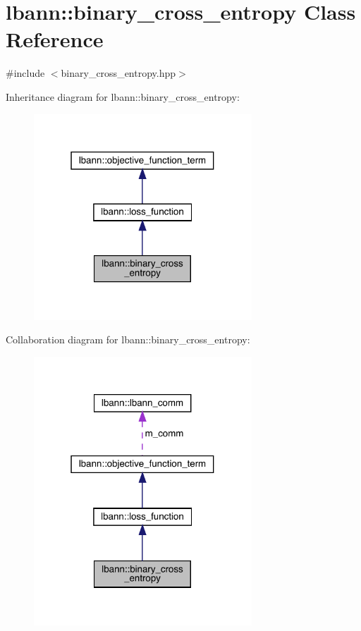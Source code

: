 \hypertarget{classlbann_1_1binary__cross__entropy}{}\section{lbann\+:\+:binary\+\_\+cross\+\_\+entropy Class Reference}
\label{classlbann_1_1binary__cross__entropy}


{\ttfamily \#include $<$binary\+\_\+cross\+\_\+entropy.\+hpp$>$}



Inheritance diagram for lbann\+:\+:binary\+\_\+cross\+\_\+entropy\+:\nopagebreak
\begin{figure}[H]
\begin{center}
\leavevmode
\includegraphics[width=232pt]{classlbann_1_1binary__cross__entropy__inherit__graph}
\end{center}
\end{figure}


Collaboration diagram for lbann\+:\+:binary\+\_\+cross\+\_\+entropy\+:\nopagebreak
\begin{figure}[H]
\begin{center}
\leavevmode
\includegraphics[width=232pt]{classlbann_1_1binary__cross__entropy__coll__graph}
\end{center}
\end{figure}
